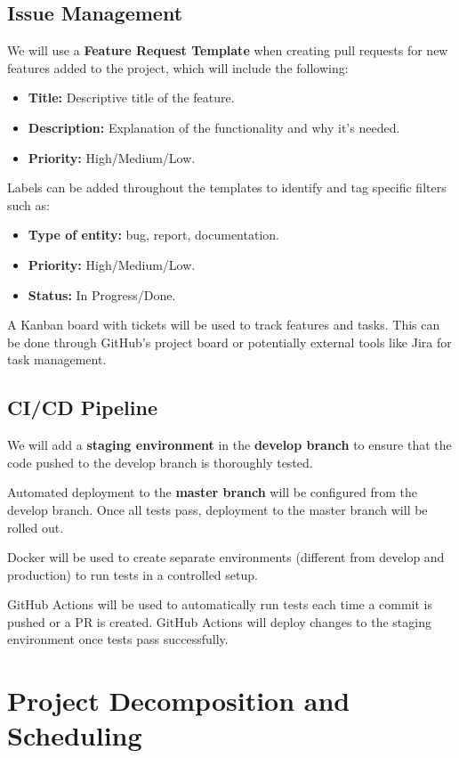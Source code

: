 \documentclass{article}
\begin{document}
\subsection*{Issue Management}
We will use a \textbf{Feature Request Template} when creating pull requests for new features added to the project, which will include the following:
\begin{itemize}
    \item \textbf{Title:} Descriptive title of the feature.
    \item \textbf{Description:} Explanation of the functionality and why it's needed.
    \item \textbf{Priority:} High/Medium/Low.
\end{itemize}

Labels can be added throughout the templates to identify and tag specific filters such as:
\begin{itemize}
    \item \textbf{Type of entity:} bug, report, documentation.
    \item \textbf{Priority:} High/Medium/Low.
    \item \textbf{Status:} In Progress/Done.
\end{itemize}

A Kanban board with tickets will be used to track features and tasks. This can be done through GitHub’s project board or potentially external tools like Jira for task management.

\subsection*{CI/CD Pipeline}
We will add a \textbf{staging environment} in the \textbf{develop branch} to ensure that the code pushed to the develop branch is thoroughly tested.

Automated deployment to the \textbf{master branch} will be configured from the develop branch. Once all tests pass, deployment to the master branch will be rolled out.

Docker will be used to create separate environments (different from develop and production) to run tests in a controlled setup.

GitHub Actions will be used to automatically run tests each time a commit is pushed or a PR is created. GitHub Actions will deploy changes to the staging environment once tests pass successfully.


\section{Project Decomposition and Scheduling}
\end{document}
